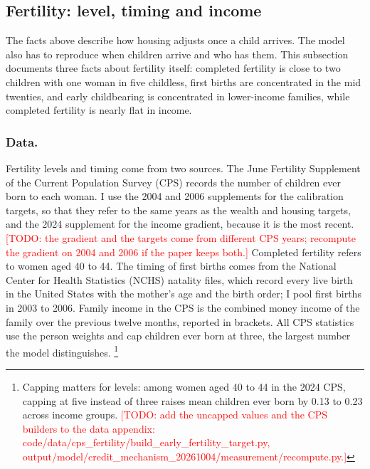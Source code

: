 \providecommand{\mocktodo}[1]{\textcolor{red}{[TODO: #1]}}

\subsection{Fertility: level, timing and income}
\label{sec:emp-fertility}

The facts above describe how housing adjusts once a child arrives. The model
also has to reproduce when children arrive and who has them. This subsection
documents three facts about fertility itself: completed fertility is close to
two children with one woman in five childless, first births are concentrated
in the mid twenties, and early childbearing is concentrated in lower-income
families, while completed fertility is nearly flat in income.

\subsubsection*{Data.}
Fertility levels and timing come from two sources. The June Fertility
Supplement of the Current Population Survey (CPS) records the number of
children ever born to each woman. I use the 2004 and 2006
supplements for the calibration targets, so that they refer to the same years
as the wealth and housing targets, and the 2024 supplement for the income
gradient, because it is the most recent.\mocktodo{the gradient and the
targets come from different CPS years; recompute the gradient on 2004 and 2006
if the paper keeps both.} Completed
fertility refers to women aged 40 to 44. The timing of first births comes from
the National Center for Health Statistics (NCHS) natality files, which record
every live birth in the United States with the mother's age and the birth
order; I pool first births in 2003 to 2006. Family income in the CPS is the
combined money income of the family over the previous twelve months, reported
in brackets. All CPS statistics use the person weights and cap children ever
born at three, the largest number the model distinguishes.%
\footnote{Capping matters for levels: among women aged 40 to 44 in the 2024
CPS, capping at five instead of three raises mean children ever born by 0.13
to 0.23 across income groups. \mocktodo{add the uncapped values and the CPS builders to the data
appendix: code/data/cps\_fertility/build\_early\_fertility\_target.py,
output/model/credit\_mechanism\_20261004/measurement/recompute.py.}}

